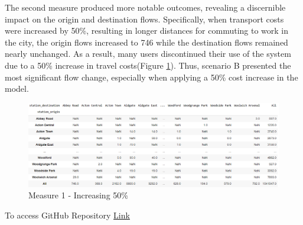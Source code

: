 \documentclass[10pt]{report}
\numberwithin{figure}{section}
\numberwithin{table}{section}
\begin{document}
The second measure produced more notable outcomes, revealing a discernible impact on the origin and destination flows. Specifically, when transport costs were increased by 50\%, resulting in longer distances for commuting to work in the city, the origin flows increased to 746 while the destination flows remained nearly unchanged. As a result, many users discontinued their use of the system due to a 50\% increase in travel costs(Figure \ref{fig:Part2_OD8_scenario B}). Thus, scenario B presented the most significant flow change, especially when applying a 50\% cost increase in the model.
    \begin{figure}[htp]
        \centering
        \includegraphics[width=16cm]{Image/Part2_OD8_scenario B.png}
        \caption{Measure 1 - Increasing 50\%}
        \label{fig:Part2_OD8_scenario B}
    \end{figure}















\newpage
\printbibliography[title = {References}]

\vspace{5mm} %

To access GitHub Repository \href{https://github.com/brfelipealmeida/LondonTubeNetwork}{Link}
\end{document}
